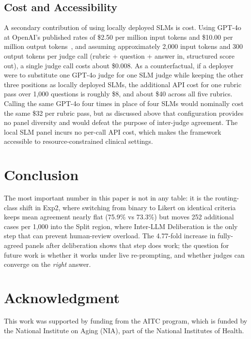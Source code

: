 \documentclass[conference]{IEEEtran}
\begin{document}
\subsection{Cost and Accessibility}

A secondary contribution of using locally deployed SLMs is cost.
Using GPT-4o at OpenAI's published rates of \$2.50 per million input
tokens and \$10.00 per million output tokens~\cite{openai2026pricing},
and assuming approximately 2,000 input tokens and 300 output tokens
per judge call (rubric + question + answer in, structured score out),
a single judge call costs about \$0.008. As a counterfactual, if a
deployer were to substitute one GPT-4o judge for one SLM judge while
keeping the other three positions as locally deployed SLMs, the
additional API cost for one rubric pass over 1,000 questions is
roughly \$8, and about \$40 across all five rubrics. Calling the
same GPT-4o four times in place of four SLMs would nominally cost
the same \$32 per rubric pass, but as discussed above that
configuration provides no panel diversity and would defeat the
purpose of inter-judge agreement. The local SLM panel incurs no
per-call API cost, which makes the framework accessible to
resource-constrained clinical settings.

\section{Conclusion}

The most important number in this paper is not in any table: it is
the routing-class shift in Exp2, where switching from binary to
Likert on identical criteria keeps mean agreement nearly flat
(75.9\% vs 73.3\%) but moves 252 additional cases per 1,000 into the
Split region, where Inter-LLM Deliberation is the only step that can
prevent human-review overload. The 4.77-fold increase in fully-agreed
panels after deliberation shows that step does work; the question
for future work is whether it works under live re-prompting,
and whether judges can converge on the \emph{right} answer.

\section*{Acknowledgment}

This work was supported by funding from the AITC program, which is
funded by the National Institute on Aging (NIA), part of the
National Institutes of Health.



\end{document}
